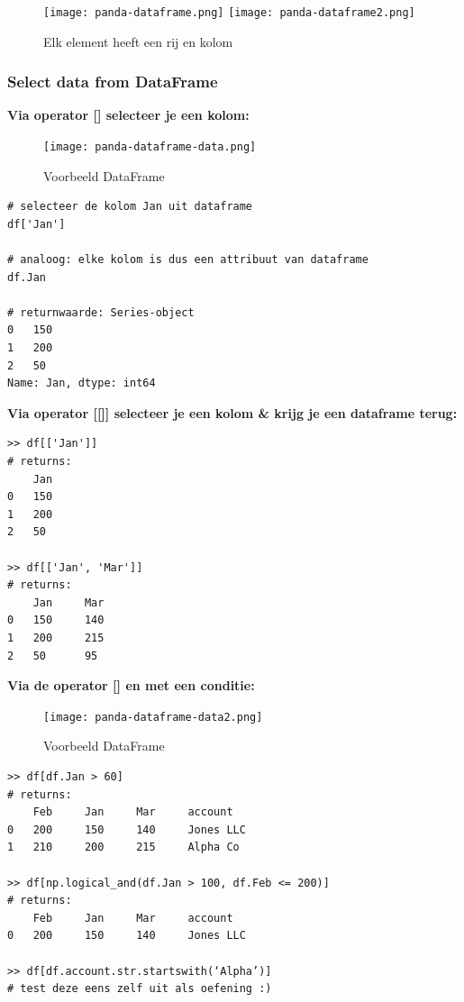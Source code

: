 \documentclass{article}
\begin{document}
\begin{figure}[H]
    \centering
    \texttt{[image: panda-dataframe.png]}
    \texttt{[image: panda-dataframe2.png]}
    \caption{Elk element heeft een rij en kolom}
\end{figure}


\subsubsection{Select data from DataFrame}

\textbf{Via operator [] selecteer je een kolom:}

\begin{figure}[H]
    \centering
    \texttt{[image: panda-dataframe-data.png]}
    \caption{Voorbeeld DataFrame}
\end{figure}


\begin{verbatim}
# selecteer de kolom Jan uit dataframe
df['Jan']

# analoog: elke kolom is dus een attribuut van dataframe
df.Jan

# returnwaarde: Series-object
0   150
1   200
2   50
Name: Jan, dtype: int64
\end{verbatim}

\textbf{Via operator [[]] selecteer je een kolom \& krijg je een dataframe terug:}

\begin{verbatim}
>> df[['Jan']]
# returns:
    Jan
0   150
1   200
2   50

>> df[['Jan', 'Mar']]
# returns:
    Jan     Mar
0   150     140
1   200     215
2   50      95
\end{verbatim}

\textbf{Via de operator [] en met een conditie:}

\begin{figure}[H]
    \centering
    \texttt{[image: panda-dataframe-data2.png]}
    \caption{Voorbeeld DataFrame}
\end{figure}

\begin{verbatim}
>> df[df.Jan > 60]
# returns:
    Feb     Jan     Mar     account
0   200     150     140     Jones LLC
1   210     200     215     Alpha Co

>> df[np.logical_and(df.Jan > 100, df.Feb <= 200)]
# returns:
    Feb     Jan     Mar     account
0   200     150     140     Jones LLC

>> df[df.account.str.startswith(‘Alpha’)]
# test deze eens zelf uit als oefening :)
\end{verbatim}
\end{document}
